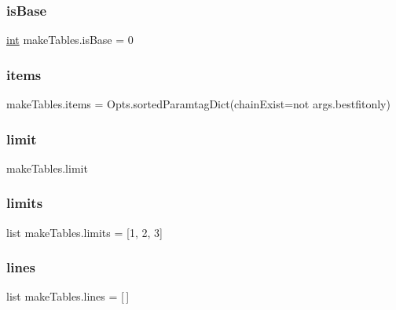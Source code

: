 \subsubsection{\texorpdfstring{is\+Base}{isBase}}
{\footnotesize\ttfamily \mbox{\hyperlink{namespacemakeTables_ae905fd0466745c7f0de3d5be4a4e028b}{int}} make\+Tables.\+is\+Base = 0}

\mbox{\label{namespacemakeTables_a35731598170459a5830e249895263c69}} 
\subsubsection{\texorpdfstring{items}{items}}
{\footnotesize\ttfamily make\+Tables.\+items = Opts.\+sorted\+Paramtag\+Dict(chain\+Exist=not args.\+bestfitonly)}

\mbox{\label{namespacemakeTables_a6b1920b359f514b3f7bfc090374ad85d}} 
\subsubsection{\texorpdfstring{limit}{limit}}
{\footnotesize\ttfamily make\+Tables.\+limit}

\mbox{\label{namespacemakeTables_a149e498d0bb0bfc39a1d52bc91a52617}} 
\subsubsection{\texorpdfstring{limits}{limits}}
{\footnotesize\ttfamily list make\+Tables.\+limits = \mbox{[}1, 2, 3\mbox{]}}

\mbox{\label{namespacemakeTables_ae0458d41b49c5abdeadb75f4cd0469c6}} 
\subsubsection{\texorpdfstring{lines}{lines}}
{\footnotesize\ttfamily list make\+Tables.\+lines = \mbox{[}$\,$\mbox{]}}

